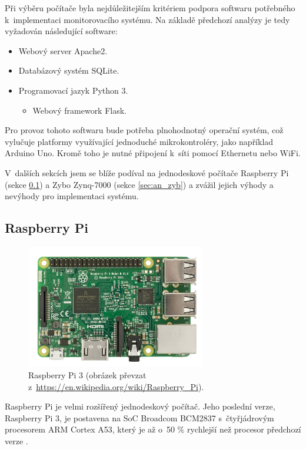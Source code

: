 Při výběru počítače byla nejdůležitejším kritériem podpora softwaru potřebného k~implementaci monitorovacího systému. Na základě předchozí analýzy je tedy vyžadován následující software:

\begin{itemize}
    \item Webový server Apache2.
    \item Databázový systém SQLite.
    \item Programovací jazyk Python 3.
    \begin{itemize}
        \item Webový framework Flask.
    \end{itemize}
\end{itemize}

Pro provoz tohoto softwaru bude potřeba plnohodnotný operační systém, což vylučuje platformy využívající jednoduché mikrokontroléry, jako například Arduino Uno. Kromě toho je nutné připojení k~síti pomocí Ethernetu nebo WiFi. 

V~dalších sekcích jsem se blíže podíval na jednodeskové počítače Raspberry Pi (sekce \ref{sec:an_rpi}) a Zybo Zynq-7000 (sekce \ref{sec:an_zyb}) a zvážil jejich výhody a nevýhody pro implementaci systému.

\subsection{Raspberry Pi}
\label{sec:an_rpi}

\begin{figure}[h!]
    \centering
    \includegraphics[width=0.7\textwidth]{images/rpi.jpg}
    \caption[Raspberry Pi 3]{Raspberry Pi 3 (obrázek převzat z~\url{https://en.wikipedia.org/wiki/Raspberry_Pi}).}
    \label{fig:rpi}
\end{figure}

Raspberry Pi je velmi rozšířený jednodeskový počítač. Jeho poslední verze, Raspberry Pi 3, je postavena na SoC Broadcom BCM2837 s~čtyřjádrovým procesorem ARM Cortex A53, který je až o~50 \% rychlejší než procesor předchozí verze \cite{rpi_benchoff}.

